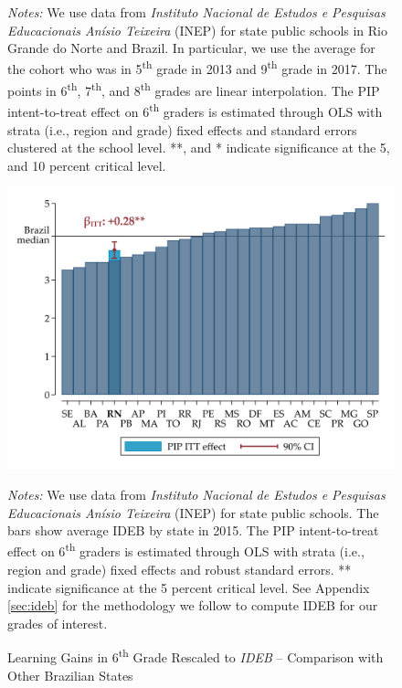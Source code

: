 \documentclass[11pt,a4paper]{article}
\begin{document}
\begin{figure}[htbp]
    \begin{minipage}{0.825\textwidth}
        \small{\textit{Notes:} We use data from \textit{Instituto Nacional de Estudos e Pesquisas Educacionais Anísio Teixeira} (INEP) for state public schools in Rio Grande do Norte and Brazil. In particular, we use the average for the cohort who was in 5\textsuperscript{th} grade in 2013 and 9\textsuperscript{th} grade in 2017. The points in 6\textsuperscript{th}, 7\textsuperscript{th}, and 8\textsuperscript{th} grades are linear interpolation. The PIP intent-to-treat effect on 6\textsuperscript{th} graders is estimated through OLS with strata (i.e., region and grade) fixed effects and standard errors clustered at the school level. **, and * indicate significance at the 5, and 10 percent critical level.}
    \end{minipage}
    
\end{figure}

\vfill
\begin{figure}[htbp]

    \centering
    \caption{Learning Gains in 6\textsuperscript{th} Grade Rescaled to \textit{IDEB} -- Comparison with Other Brazilian States}
    
    \includegraphics[width=15cm]{DataWork/Output/Figures/figA10-itt_IDEB.png}
    \label{fig:itt_IDEB}
    
    \begin{minipage}{0.825\textwidth}
        \small{\textit{Notes:} We use data from \textit{Instituto Nacional de Estudos e Pesquisas Educacionais Anísio Teixeira} (INEP) for state public schools. The bars show average IDEB by state in 2015. The PIP intent-to-treat effect on 6\textsuperscript{th} graders is estimated through OLS with strata (i.e., region and grade) fixed effects and robust standard errors. ** indicate significance at the 5 percent critical level. See Appendix \ref{sec:ideb} for the methodology we follow to compute IDEB for our grades of interest.}
    \end{minipage}
    
\end{figure}
\vfill
\end{document}
